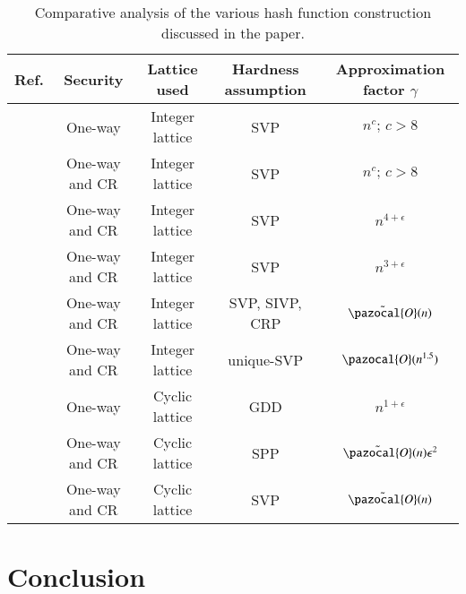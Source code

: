 \documentclass[10pt]{elsarticle}
\begin{document}
\begin{table}[H]
\renewcommand{\arraystretch}{1.3}
\caption{Comparative analysis of the various hash function construction discussed in the paper. }
\label{qrbt_Tab2}
\centering
\begin{tabular}{|c||c||c||c||c|}
\hline
\textbf{Ref.} & \textbf{Security} & \textbf{Lattice used}& \textbf{Hardness assumption} & \textbf{Approximation factor $\gamma$} \\
\hline
\cite{CRHF_Ajtai1996} & One-way & Integer lattice & SVP & $n^{c}; \, c > 8$ \\
\hline
\cite{CRHF_Goldreich1996} & One-way and CR & Integer lattice & SVP & $n^{c}; \, c > 8$ \\
\hline

\cite{CRHF_Cai1997} & One-way and CR & Integer lattice & SVP & $n^{4 + \epsilon}$ \\

\hline

\cite{CRHF_Micciancio2002} & One-way and CR & Integer lattice & SVP & $n^{3 + \epsilon}$ \\

\hline
\cite{CRHF_Micciancio2004} & One-way and CR & Integer lattice & SVP, SIVP, CRP & $\Tilde{\pazocal{O}}(n)$ \\
\hline
\cite{CRHF_Regev} & One-way and CR & Integer lattice & unique-SVP & $\pazocal{O}(n^{1.5})$ \\

\hline
\cite{CRHF_Micciancio2002_compact_knapsacks} & One-way & Cyclic lattice & GDD & $n^{1 + \epsilon}$ \\

\hline

\cite{CRHF_Lyubashevsky2006} & One-way and CR & Cyclic lattice & SPP & $\Tilde{\pazocal{O}}(n) \mathcal{\epsilon}^{2}$ \\
\hline

\cite{CRHF_Peikert2006} & One-way and CR & Cyclic lattice & SVP & $\Tilde{\pazocal{O}}(n) $ \\


\hline
\end{tabular}
\end{table}


\section{Conclusion}
\end{document}
